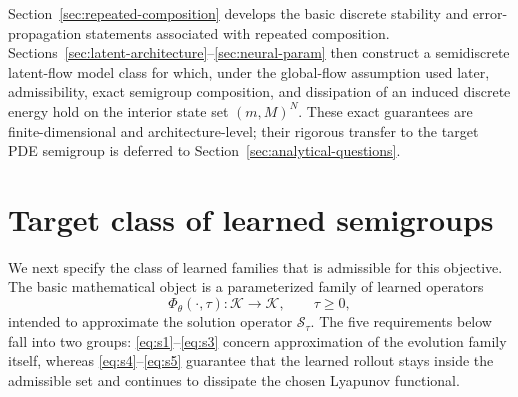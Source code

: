 \documentclass[11pt]{article}
\newcommand{\cS}{\mathcal{S}}
\newcommand{\cK}{\mathcal{K}}
\newcommand{\PhiT}{\Phi_{\theta}}
\begin{document}
Section~\ref{sec:repeated-composition} develops the basic discrete stability and error-propagation statements associated with repeated composition. Sections~\ref{sec:latent-architecture}--\ref{sec:neural-param} then construct a semidiscrete latent-flow model class for which, under the global-flow assumption used later, admissibility, exact semigroup composition, and dissipation of an induced discrete energy hold on the interior state set \((m,M)^N\). These exact guarantees are finite-dimensional and architecture-level; their rigorous transfer to the target PDE semigroup is deferred to Section~\ref{sec:analytical-questions}.

\section{Target class of learned semigroups}
We next specify the class of learned families that is admissible for this objective. The basic mathematical object is a parameterized family of learned operators
\begin{equation}\label{eq:learned-family}
\PhiT(\cdot,\tau) : \cK \to \cK, \qquad \tau\ge 0,
\end{equation}
intended to approximate the solution operator \(\cS_{\tau}\). The five requirements below fall into two groups: \eqref{eq:s1}--\eqref{eq:s3} concern approximation of the evolution family itself, whereas \eqref{eq:s4}--\eqref{eq:s5} guarantee that the learned rollout stays inside the admissible set and continues to dissipate the chosen Lyapunov functional.
\end{document}
